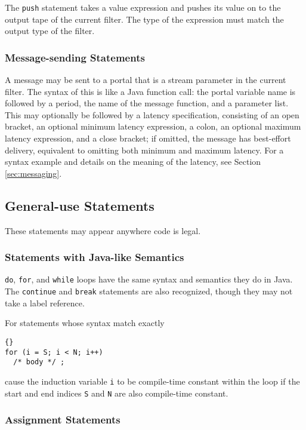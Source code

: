 \documentclass[11pt]{article}
\begin{document}
The \lstinline|push| statement takes a value expression and pushes its
value on to the output tape of the current filter.  The type of the
expression must match the output type of the filter.

\subsubsection{Message-sending Statements}

A message may be sent to a portal that is a stream parameter in the
current filter.  The syntax of this is like a Java function call: the
portal variable name is followed by a period, the name of the message
function, and a parameter list.  This may optionally be followed by a
latency specification, consisting of an open bracket, an optional
minimum latency expression, a colon, an optional maximum latency
expression, and a close bracket; if omitted, the message has
best-effort delivery, equivalent to omitting both minimum and maximum
latency.  For a syntax example and details on the meaning of the
latency, see Section \ref{sec:messaging}.

\subsection{General-use Statements}

These statements may appear anywhere code is legal.

\subsubsection{Statements with Java-like Semantics}

\lstinline|do|, \lstinline|for|, and \lstinline|while| loops have the same
syntax and semantics they do in Java.  The \lstinline|continue| and
\lstinline|break| statements are also recognized, though they may not
take  a label reference.

For statements whose syntax match exactly

\begin{lstlisting}{}
for (i = S; i < N; i++)
  /* body */ ;
\end{lstlisting}

\noindent
cause the induction variable \lstinline|i| to be compile-time constant
within the loop if the start and end indices \lstinline|S| and \lstinline|N| are
also compile-time constant.

\subsubsection{Assignment Statements}
\end{document}
